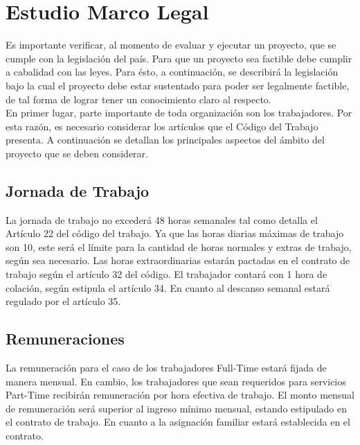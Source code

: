 \section{Estudio Marco Legal}

Es importante verificar, al momento de
evaluar y ejecutar un proyecto, que 
se cumple con la legislación del país.
Para que un proyecto sea factible
debe cumplir a cabalidad con las leyes. 
Para ésto, a continuación, se describirá 
la legislación bajo la cual el proyecto debe 
estar sustentado para poder ser legalmente 
factible, de tal forma de lograr tener
un conocimiento claro al respecto.\\

En primer lugar, parte importante
de toda organización son los
trabajadores. Por esta razón, 
es necesario considerar los 
artículos que el Código del Trabajo
presenta. A continuación se detallan
los principales aspectos del ámbito
del proyecto que se deben considerar.

\subsection*{Jornada de Trabajo}

La jornada de trabajo
no excederá 48 horas semanales
tal como detalla el Artículo 22
del código del trabajo. Ya que
las horas diarias máximas de
trabajo son 10, este será
el límite para la cantidad
de horas normales y extras
de trabajo, según sea necesario.
Las horas extraordinarias estarán
pactadas en el contrato de trabajo
según el artículo 32 del código.
El trabajador contará con 1 hora de
colación, según estipula el 
artículo 34. En cuanto al descanso
semanal estará regulado por el
artículo 35.

\subsection*{Remuneraciones}

La remuneración para el caso de
los trabajadores Full-Time estará
fijada de manera mensual. En cambio,
los trabajadores que sean requeridos
para servicios Part-Time recibirán
remuneración por hora efectiva
de trabajo. El monto mensual
de remuneración será superior
al ingreso mínimo mensual, estando
estipulado en el contrato de trabajo.
En cuanto a la asignación familiar
estará establecida en el contrato.

